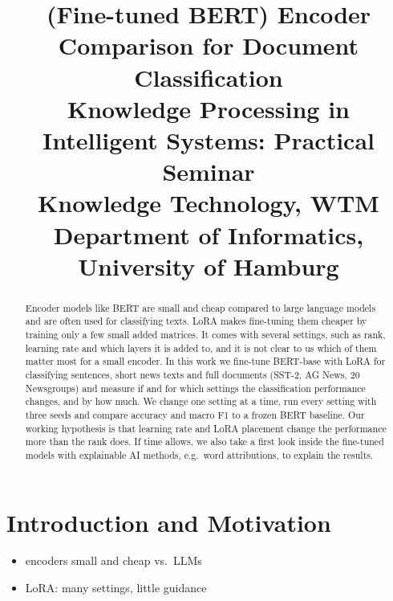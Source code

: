 \documentclass[conference]{IEEEtran}  %
\newcommand{\trtitle}{(Fine-tuned BERT) Encoder Comparison for Document Classification}
\newcommand{\titleshort}{KPIS EC4DC} %
\newcommand{\authorlastnames}{Ebert, Hamza} %
\newcommand{\trcourse}{Knowledge Processing in Intelligent Systems: Practical Seminar}
\newcommand{\trgroup}{Knowledge Technology, WTM}
\newcommand{\truniversity}{Department of Informatics, University of Hamburg}
\newcommand{\new}[1]{\textcolor{newgreen}{#1}}  %
\theoremstyle{plain}
\theoremstyle{definition}
\theoremstyle{remark}
\begin{document}
\title{\trtitle\\[1.5ex]
\large \trcourse\\[0.5ex]
\trgroup\\[0.5ex]
\truniversity}

\renewcommand{\headheight}{14.5pt}
\fancyhead[LO]{\slshape \authorlastnames}
\fancyhead[RO]{ \slshape \titleshort}

\author{
\and
{}
}

\maketitle


\begin{abstract}
Encoder models like BERT are small and cheap compared to large language models and are often used for classifying texts.
LoRA makes fine-tuning them cheaper by training only a few small added matrices.
It comes with several settings, such as rank, learning rate and which layers it is added to, and it is not clear to us which of them matter most for a small encoder.
In this work we fine-tune BERT-base with LoRA for \new{classifying sentences, short news texts and full documents (SST-2, AG News, 20 Newsgroups)} and measure if and for which settings the classification performance changes, and by how much.
We change one setting at a time, run every setting with three seeds and compare accuracy and macro F1 to a frozen BERT baseline.
Our working hypothesis is that learning rate and LoRA placement change the performance more than the rank does.
If time allows, we also take a first look inside the fine-tuned models with explainable AI methods, e.g.\ word attributions, to explain the results.
\end{abstract}

\IEEEpeerreviewmaketitle

\section{Introduction and Motivation}
\label{sec:introduction}
\begin{itemize}
  \item encoders small and cheap vs.\ LLMs
  \item LoRA: many settings, little guidance
\end{itemize}
\end{document}
